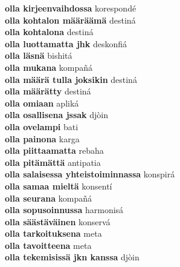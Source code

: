 \textbf{ olla kirjeenvaihdossa  } korespondé \\
\textbf{ olla kohtalon määräämä  } destiná \\
\textbf{ olla kohtalona  } destiná \\
\textbf{ olla luottamatta jhk  } deskonfiá \\
\textbf{ olla läsnä  } bishitá \\
\textbf{ olla mukana  } kompañá \\
\textbf{ olla määrä tulla joksikin  } destiná \\
\textbf{ olla määrätty  } destiná \\
\textbf{ olla omiaan  } apliká \\
\textbf{ olla osallisena jssak  } djòin \\
\textbf{ olla ovelampi  } bati \\
\textbf{ olla painona  } karga \\
\textbf{ olla piittaamatta  } rebaha \\
\textbf{ olla pitämättä  } antipatia \\
\textbf{ olla salaisessa yhteistoiminnassa  } konspirá \\
\textbf{ olla samaa mieltä  } konsentí \\
\textbf{ olla seurana  } kompañá \\
\textbf{ olla sopusoinnussa  } harmonisá \\
\textbf{ olla säästäväinen  } konservá \\
\textbf{ olla tarkoituksena  } meta \\
\textbf{ olla tavoitteena  } meta \\
\textbf{ olla tekemisissä jkn kanssa  } djòin \\
